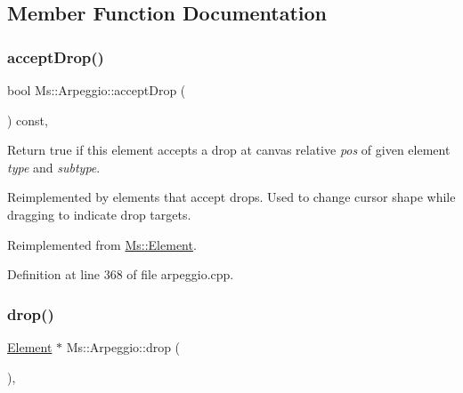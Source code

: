 \subsection{Member Function Documentation}
\mbox{\label{class_ms_1_1_arpeggio_a5d4feb5b9eb35c1afb9e14a7e0fad66b}} 
\subsubsection{\texorpdfstring{accept\+Drop()}{acceptDrop()}}
{\footnotesize\ttfamily bool Ms\+::\+Arpeggio\+::accept\+Drop (\begin{DoxyParamCaption}\item[{\hyperlink{class_ms_1_1_edit_data}{Edit\+Data} \&}]{ }\end{DoxyParamCaption}) const\hspace{0.3cm}{\ttfamily [override]}, {\ttfamily [virtual]}}

Return true if this element accepts a drop at canvas relative {\itshape pos} of given element {\itshape type} and {\itshape subtype}.

Reimplemented by elements that accept drops. Used to change cursor shape while dragging to indicate drop targets. 

Reimplemented from \hyperlink{class_ms_1_1_element_a35614445f0bc2212cbcc75c3f5810543}{Ms\+::\+Element}.



Definition at line 368 of file arpeggio.\+cpp.

\mbox{\label{class_ms_1_1_arpeggio_a2e88f8c714c6b69b52503d48729b973b}} 
\subsubsection{\texorpdfstring{drop()}{drop()}}
{\footnotesize\ttfamily \hyperlink{class_ms_1_1_element}{Element} $\ast$ Ms\+::\+Arpeggio\+::drop (\begin{DoxyParamCaption}\item[{\hyperlink{class_ms_1_1_edit_data}{Edit\+Data} \&}]{ }\end{DoxyParamCaption})\hspace{0.3cm}{\ttfamily [override]}, {\ttfamily [virtual]}}

